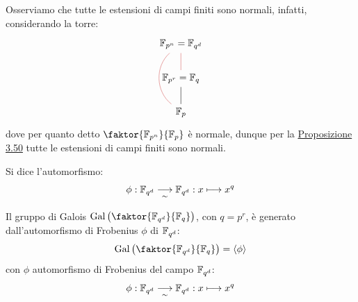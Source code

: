 \documentclass[11pt]{scrartcl}
\begin{document}
\begin{remark}
    Osserviamo che tutte le estensioni di campi finiti sono normali, infatti, considerando la torre:
    \[\begin{tikzcd}
        {\mathbb{F}_{p^n}=\mathbb{F}_{q^d} } \\
        {\mathbb{F}_{p^r}=\mathbb{F}_{q} } \\
        {\mathbb{F}_{p}}
        \arrow[no head, from=3-1, to=2-1]
        \arrow[color={rgb,255:red,214;green,92;blue,92}, no head, from=2-1, to=1-1]
        \arrow[color={rgb,255:red,214;green,92;blue,92}, bend right = 50, no head, from=1-1, to=3-1]
    \end{tikzcd}\]
    dove per quanto detto $\faktor{\Fpn}{\Fp}$ è normale, dunque per la \hyperref[3.50]{Proposizione 3.50} tutte le estensioni di campi finiti sono normali.
\end{remark}

\begin{definition}
    Si dice  l'automorfismo:
    \[ \phi : \mathbb{F}_{q^d} \underset{\sim}{\longrightarrow} \mathbb{F}_{q^d} : x \longmapsto x^q
        \]
\end{definition}

\begin{theorem}
    Il gruppo di Galois $\Gal\left(\faktor{\F{q^d}}{\F{q}}\right)$, con $q = p^r$, è generato dall'automorfismo di Frobenius $\phi$ di $\mathbb{F}_{q^d}$:
    \[ \Gal\left(\faktor{\F{q^d}}{\F{q}}\right) = \left<\phi\right>
        \]
    con $\phi$ automorfismo di Frobenius del campo $\mathbb{F}_{q^d}$:
    \[ \phi : \mathbb{F}_{q^d} \underset{\sim}{\longrightarrow} \mathbb{F}_{q^d} : x \longmapsto x^q
        \]
\end{theorem}
\end{document}
